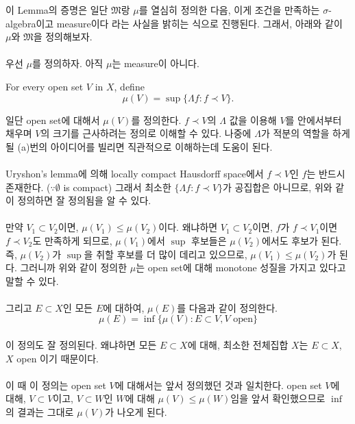 \documentclass[11pt,reqno]{amsart}
\renewcommand{\(}{\left(}
\renewcommand{\)}{\right)}
\renewcommand{\[}{\left[}
\renewcommand{\]}{\right]}
\newenvironment{textbox}
  {\begin{tcolorbox}[
    colback=gray!10, 
    colframe=gray!50, 
    boxrule=0.5pt,
    fontupper=\normalfont
  ]}
  {\end{tcolorbox}}
\newcommand{\M}{\mathfrak{M}}
\begin{document}
이 Lemma의 증명은 일단 $\M$랑 $\mu$를 열심히 정의한 다음, 이게 조건을 만족하는 $\sigma$-algebra이고 measure이다
라는 사실을 밝히는 식으로 진행된다. 그래서, 아래와 같이 $\mu$와 $\M$을 정의해보자. \\ \\ 
우선 $\mu$를 정의하자. 아직 $\mu$는 measure이 아니다.
\begin{textbox}
  For every open set $V$ in $X$, define
  \begin{equation}
    \mu(V) = \sup \{ \Lambda f : f \prec V \}.
  \end{equation}
\end{textbox}
일단 open set에 대해서 $\mu(V)$를 정의한다. $f \prec V$의 $\Lambda$ 값을 이용해 $V$를 안에서부터 채우며 
$V$의 크기를 근사하려는 정의로 이해할 수 있다. 나중에 $\Lambda$가 적분의 역할을 하게 될 (a)번의 아이디어를 
빌리면 직관적으로 이해하는데 도움이 된다. \\ \\
Uryshon's lemma에 의해 locally compact Hausdorff space에서 $f \prec V$인 $f$는 반드시 존재한다. 
($\because \emptyset$ is compact) 그래서 최소한 $\{ \Lambda f : f \prec V \}$가 공집합은 아니므로, 
위와 같이 정의하면 잘 정의됨을 알 수 있다. \\ \\
만약 $V_1 \subset V_2$이면, $\mu(V_1) \le \mu(V_2)$이다.
왜냐하면 $V_1 \subset V_2$이면, $f$가 $f \prec V_1$이면 $f \prec V_2$도 만족하게 되므로, $\mu(V_1)$에서 
$\sup$ 후보들은 $\mu(V_2)$에서도 후보가 된다. 즉, $\mu(V_2)$가 $\sup$을 취할 후보를 더 많이 데리고
있으므로, $\mu(V_1) \le \mu(V_2)$가 된다. 그러니까 위와 같이 정의한 $\mu$는 open set에 대해 monotone 성질을
가지고 있다고 말할 수 있다. \\ \\
그리고 $E \subset X$인 모든 $E$에 대하여, $\mu(E)$를 다음과 같이 정의한다. \\
\begin{equation}
  \mu(E) = \inf \{ \mu(V): E \subset V, V \text{ open} \}
\end{equation} \\
이 정의도 잘 정의된다. 왜냐하면 모든 $E \subset X$에 대해, 최소한 전체집합 $X$는 $E\subset X$, $X$ open 이기 때문이다. \\ \\
이 때 이 정의는 open set $V$에 대해서는 앞서 정의했던 것과 일치한다. open set $V$에 대해, 
$V \subset V$이고, $V \subset W$인 $W$에 대해 $\mu (V) \le \mu (W)$임을 앞서 확인했으므로 $\inf$의 결과는 
그대로 $\mu(V)$가 나오게 된다. \\ \\
\end{document}
